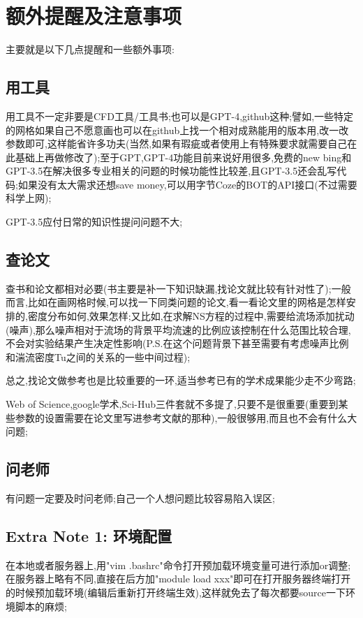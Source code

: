 \chapter{额外提醒及注意事项}
主要就是以下几点提醒和一些额外事项:
\section{用工具}
用工具不一定非要是CFD工具/工具书;也可以是GPT-4,github这种;譬如,一些特定的网格如果自己不愿意画也可以在github上找一个相对成熟能用的版本用,改一改参数即可,这样能省许多功夫(当然,如果有瑕疵或者使用上有特殊要求就需要自己在此基础上再做修改了);至于GPT,GPT-4功能目前来说好用很多,免费的new bing和GPT-3.5在解决很多专业相关的问题的时候功能性比较差,且GPT-3.5还会乱写代码;如果没有太大需求还想save money,可以用字节Coze的BOT的API接口(不过需要科学上网);\par
GPT-3.5应付日常的知识性提问问题不大;

\section{查论文}
查书和论文都相对必要(书主要是补一下知识缺漏,找论文就比较有针对性了);一般而言,比如在画网格时候,可以找一下同类问题的论文,看一看论文里的网格是怎样安排的,密度分布如何,效果怎样;又比如,在求解NS方程的过程中,需要给流场添加扰动(噪声),那么噪声相对于流场的背景平均流速的比例应该控制在什么范围比较合理,不会对实验结果产生决定性影响(P.S.在这个问题背景下甚至需要有考虑噪声比例和湍流密度Tu之间的关系的一些中间过程);\par
总之,找论文做参考也是比较重要的一环,适当参考已有的学术成果能少走不少弯路;\par
Web of Science,google学术,Sci-Hub三件套就不多提了,只要不是很重要(重要到某些参数的设置需要在论文里写进参考文献的那种),一般很够用,而且也不会有什么大问题;

\section{问老师}
有问题一定要及时问老师;自己一个人想问题比较容易陷入误区;


\section{Extra Note 1: 环境配置}
在本地或者服务器上,用"vim .bashrc"命令打开预加载环境变量可进行添加or调整;在服务器上略有不同,直接在后方加"module load xxx"即可在打开服务器终端打开的时候预加载环境(编辑后重新打开终端生效),这样就免去了每次都要source一下环境脚本的麻烦;\par


